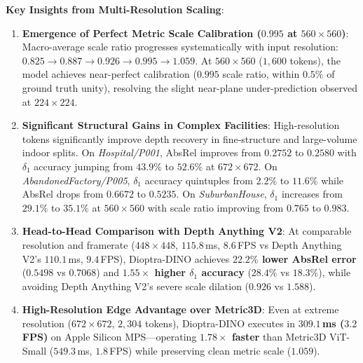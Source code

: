 \noindent\textbf{Key Insights from Multi-Resolution Scaling}:
\begin{enumerate}
    \item \textbf{Emergence of Perfect Metric Scale Calibration ($0.995$ at $560 \times 560$)}: Macro-average scale ratio progresses systematically with input resolution: $0.825 \to 0.887 \to 0.926 \to \mathbf{0.995} \to 1.059$. At $560 \times 560$ ($1{,}600$ tokens), the model achieves near-perfect calibration ($0.995$ scale ratio, within $0.5\%$ of ground truth unity), resolving the slight near-plane under-prediction observed at $224 \times 224$.
    \item \textbf{Significant Structural Gains in Complex Facilities}: High-resolution tokens significantly improve depth recovery in fine-structure and large-volume indoor splits. On \textit{Hospital/P001}, AbsRel improves from $0.2752$ to \textbf{$0.2580$} with $\delta_1$ accuracy jumping from $43.9\%$ to \textbf{$52.6\%$} at $672 \times 672$. On \textit{AbandonedFactory/P005}, $\delta_1$ accuracy quintuples from $2.2\%$ to \textbf{$11.6\%$} while AbsRel drops from $0.6672$ to \textbf{$0.5235$}. On \textit{SuburbanHouse}, $\delta_1$ increases from $29.1\%$ to \textbf{$35.1\%$} at $560 \times 560$ with scale ratio improving from $0.765$ to $0.983$.
    \item \textbf{Head-to-Head Comparison with Depth Anything V2}: At comparable resolution and framerate ($448 \times 448$, $115.8$\,ms, $8.6$\,FPS vs Depth Anything V2's $110.1$\,ms, $9.4$\,FPS), Dioptra-DINO achieves \textbf{$22.2\%$ lower AbsRel error} ($0.5498$ vs $0.7068$) and \textbf{$1.55\times$ higher $\delta_1$ accuracy} ($28.4\%$ vs $18.3\%$), while avoiding Depth Anything V2's severe scale dilation ($0.926$ vs $1.588$).
    \item \textbf{High-Resolution Edge Advantage over Metric3D}: Even at extreme resolution ($672 \times 672$, $2{,}304$ tokens), Dioptra-DINO executes in \textbf{$309.1$\,ms ($3.2$\,FPS)} on Apple Silicon MPS—operating \textbf{$1.78\times$ faster} than Metric3D ViT-Small ($549.3$\,ms, $1.8$\,FPS) while preserving clean metric scale ($1.059$).
\end{enumerate}



